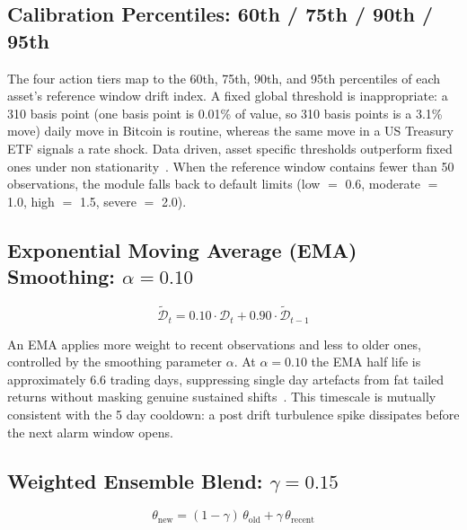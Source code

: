 \subsection{Calibration Percentiles: 60th / 75th / 90th / 95th}
\label{subsec:param_calibration}

The four action tiers map to the 60th, 75th, 90th, and 95th percentiles of each asset's reference window drift index. A fixed global threshold is inappropriate: a 310 basis point (one basis point is 0.01\% of value, so 310 basis points is a 3.1\% move) daily move in Bitcoin is routine, whereas the same move in a US Treasury ETF signals a rate shock. Data driven, asset specific thresholds outperform fixed ones under non stationarity~\cite{bifet2007adwin}. When the reference window contains fewer than 50 observations, the module falls back to default limits (low $=$ 0.6, moderate $=$ 1.0, high $=$ 1.5, severe $=$ 2.0).

\subsection{Exponential Moving Average (EMA) Smoothing: $\alpha = 0.10$}
\label{subsec:param_ema}

\begin{equation}
  \tilde{\mathcal{D}}_t = 0.10 \cdot \mathcal{D}_t + 0.90 \cdot \tilde{\mathcal{D}}_{t-1}
  \label{eq:ema_ch2}
\end{equation}

An EMA applies more weight to recent observations and less to older ones, controlled by the smoothing parameter $\alpha$. At $\alpha = 0.10$ the EMA half life is approximately 6.6 trading days, suppressing single day artefacts from fat tailed returns without masking genuine sustained shifts~\cite{gardner1985,brown1959}. This timescale is mutually consistent with the 5 day cooldown: a post drift turbulence spike dissipates before the next alarm window opens.

\subsection{Weighted Ensemble Blend: $\gamma = 0.15$}
\label{subsec:param_gamma}

\begin{equation}
  \theta_{\text{new}} = (1 - \gamma)\,\theta_{\text{old}} + \gamma\,\theta_{\text{recent}}
  \label{eq:gamma_ch2}
\end{equation}

